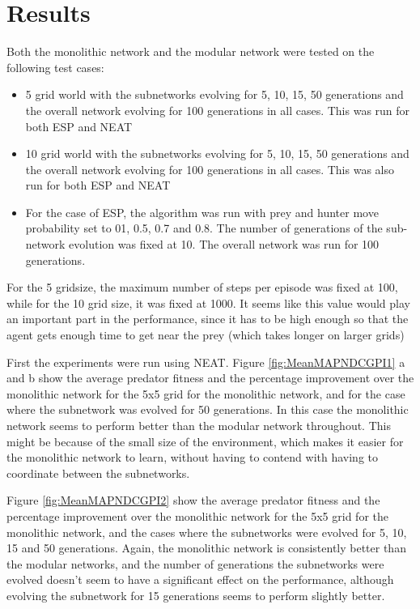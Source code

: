 \section{Results}
Both the monolithic network and the modular network were tested on the following test cases:
\begin{itemize}
\item 5  grid world with the subnetworks evolving for 5, 10, 15, 50 generations and the overall network evolving for 100 generations in all cases. This was run for both ESP and NEAT
\item 10  grid world with the subnetworks evolving for 5, 10, 15, 50 generations and the overall network evolving for 100 generations in all cases. This was also run for both ESP and NEAT
\item For the case of ESP, the algorithm was run with prey and hunter move probability set to 01, 0.5, 0.7 and 0.8. The number of generations of the sub-network evolution was fixed at 10. The overall network was run for 100 generations. 
\end{itemize}

For the 5  gridsize, the maximum number of steps per episode was fixed at 100, while for the 10  grid size, it was fixed at 1000. It seems like this value would play an important part in the performance, since it has to be high enough so that the agent gets enough time to get near the prey (which takes longer on larger grids) 

First the experiments were run using NEAT.
Figure \ref{fig:MeanMAPNDCGPI1} a and b show the average predator fitness and the percentage improvement over the monolithic network for the 5x5 grid for the monolithic network, and for the case where the subnetwork was evolved for 50 generations. In this case the monolithic network seems to perform better than the modular network throughout. This might be because of the small size of the environment, which makes it easier for the monolithic network to learn, without having to contend with having to coordinate between the subnetworks. 

Figure \ref{fig:MeanMAPNDCGPI2} show the average predator fitness and the percentage improvement over the monolithic network for the 5x5 grid for the monolithic network, and the cases where the subnetworks were evolved for 5, 10, 15 and 50 generations. Again, the monolithic network is consistently better than the modular networks, and the number of generations the subnetworks were evolved doesn't seem to have a significant effect on the performance, although evolving the subnetwork for 15 generations seems to perform slightly better.

